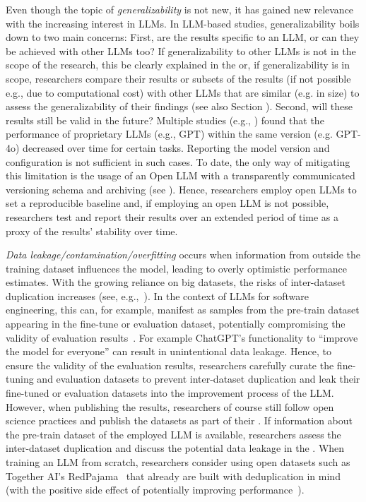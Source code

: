 Even though the topic of \emph{generalizability} is not new, it has gained new relevance with the increasing interest in LLMs. In LLM-based studies, generalizability boils down to two main concerns:
First, are the results specific to an LLM, or can they be achieved with other LLMs too? 
If generalizability to other LLMs is not in the scope of the research, this \must be clearly explained in the \paper or, if generalizability is in scope, researchers \must compare their results or subsets of the results (if not possible e.g., due to computational cost) with other LLMs that are similar (e.g. in size) to assess the generalizability of their findings (see also Section \openllm).
Second, will these results still be valid in the future?
Multiple studies (e.g., \cite{DBLP:journals/corr/abs-2307-09009, doi:10.1148/radiol.232411}) found that the performance of proprietary LLMs (e.g., GPT) within the same version (e.g. GPT-4o) decreased over time for certain tasks.
Reporting the model version and configuration is not sufficient in such cases. To date, the only way of mitigating this limitation is the usage of an Open LLM with a transparently communicated versioning schema and archiving (see \openllm). Hence, researchers \should employ open LLMs to set a reproducible baseline and, if employing an open LLM is not possible, researchers \should test and report their results over an extended period of time as a proxy of the results' stability over time.

\emph{Data leakage/contamination/overfitting} occurs when information from outside the training dataset influences the model, leading to overly optimistic performance estimates.
With the growing reliance on big datasets, the risks of inter-dataset duplication increases (see, e.g.,~\cite{DBLP:journals/pacmpl/LopesMMSYZSV17, DBLP:conf/oopsla/Allamanis19}). 
In the context of LLMs for software engineering, this can, for example, manifest as samples from the pre-train dataset appearing in the fine-tune or evaluation dataset, potentially compromising the validity of evaluation results~\cite{DBLP:journals/tse/LopezCSSV25}.
For example ChatGPT's functionality to ``improve the model for everyone'' can result in unintentional data leakage.
Hence, to ensure the validity of the evaluation results, researchers \should carefully curate the fine-tuning and evaluation datasets to prevent inter-dataset duplication and \mustnot leak their fine-tuned or evaluation datasets into the improvement process of the LLM.
However, when publishing the results, researchers \should of course still follow open science practices and publish the datasets as part of their \supplementarymaterial.
If information about the pre-train dataset of the employed LLM is available, researchers \should assess the inter-dataset duplication and \must discuss the potential data leakage in the \paper.
When training an LLM from scratch, researchers \may consider using open datasets such as Together AI's RedPajama~\cite{together2023redpajama} that already are built with deduplication in mind (with the positive side effect of potentially improving performance~\cite{DBLP:conf/acl/LeeINZECC22}).

